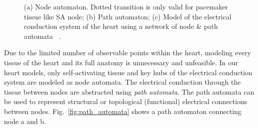 \documentclass[openany]{now} %
\newcommand{\figref}[1]{Fig.~\ref{fig:#1}}
\begin{document}
\begin{figure}[!t]
\centering
\label{fig:h_automatas}
\caption{\small (a) Node automaton. Dotted transition is only valid for pacemaker tissue like SA node; (b) Path automaton; (c) Model of the electrical conduction system of the heart using a network of node \& path automata ~\cite{vhm_ecrts10}.}
\end{figure} 

Due to the limited number of observable points within the heart, modeling every tissue of the heart and its full anatomy is unnecessary and unfeasible. In our heart models, only self-activating tissue and key hubs of the electrical conduction system are modeled as node automata. The electrical conduction through the tissue between nodes are abstracted using \emph{path automata}. The path automata can be used to represent structural or topological (functional) electrical connections between nodes. \figref{path_automata} shows a path automaton connecting node a and b.
\end{document}

